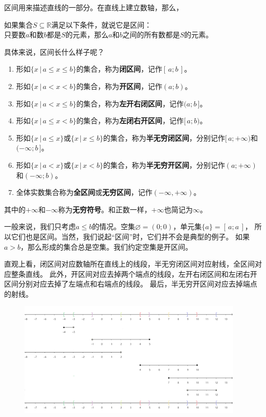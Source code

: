 \documentclass[12pt,UTF8]{ctexbook}
\begin{document}
区间用来描述直线的一部分。在直线上建立数轴，那么，

\begin{df}\label{df:5-3-0}
    如果集合$S\subseteq \mathbb{R}$满足以下条件，就说它是区间：\\
    只要数$a$和数$b$都是$S$的元素，那么$a$和$b$之间的所有数都是$S$的元素。
\end{df}

具体来说，区间长什么样子呢？
\begin{enumerate}
    \item 形如$\{x \, | \, a \leqslant x \leqslant b\}$的集合，称为\textbf{闭区间}，记作$[\, a; b\,]$。
    \item 形如$\{x \, | \, a < x < b\}$的集合，称为\textbf{开区间}，记作$(a; b)$。
    \item 形如$\{x \, | \, a < x \leqslant b\}$的集合，称为\textbf{左开右闭区间}，记作$(a; b\,]$。
    \item 形如$\{x \, | \, a \leqslant x < b\}$的集合，称为\textbf{左闭右开区间}，记作$[\, a; b)$。
    \item 形如$\{x \, | \, a \leqslant x \}$或$\{x \, | \, x \leqslant b \}$的集合，称为\textbf{半无穷闭区间}，分别记作$[\, a; +\infty)$和$(-\infty; b\,]$。
    \item 形如$\{x \, | \, a < x \}$或$\{x \, | \, x < b \}$的集合，称为\textbf{半无穷开区间}，分别记作$(a; +\infty)$和$(-\infty; b)$。
    \item 全体实数集合称为\textbf{全区间}或\textbf{无穷区间}，记作$(-\infty, +\infty)$。
\end{enumerate}
其中的$+\infty$和$-\infty$称为\textbf{无穷符号}。和正数一样，$+\infty$也简记为$\infty$。

一般来说，我们只考虑$a \leqslant b$的情况。空集$\varnothing = (0; 0)$，单元集$\{a\} = [\, a; a\,]$，
所以它们也是区间。当然，我们说起“区间”时，它们并不会是典型的例子。
如果$a > b$，那么形成的集合总是空集。我们约定空集是开区间。

直观上看，闭区间对应数轴所在直线上的线段，半无穷闭区间对应射线，全区间对应整条直线。
此外，开区间对应去掉两个端点的线段，左开右闭区间和左闭右开区间分别对应去掉了左端点和右端点的线段。
最后，半无穷开区间对应去掉端点的射线。

\begin{figure}[H] %
    \vspace{8pt}
    \includegraphics[width=0.96\textwidth]{tu/区间1.png}
\end{figure}
\end{document}
